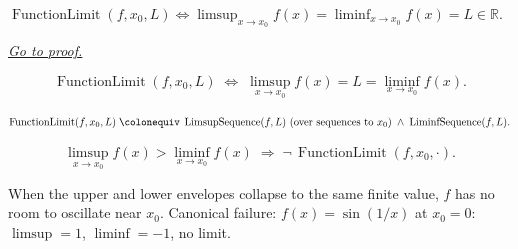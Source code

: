 
\begin{proposition}[Limit Exists iff $\limsup=\liminf$]
\label{prop:limsup-liminf-limit-criterion}
$\operatorname{FunctionLimit}(f,x_0,L)\iff
\limsup_{x\to x_0}f(x)=\liminf_{x\to x_0}f(x)=L\in\mathbb{R}$.

\smallskip\noindent
\hyperref[prf:limsup-liminf-limit-criterion]{\textit{Go to proof.}}
\end{proposition}

\begin{remark*}
\[
  \operatorname{FunctionLimit}(f,x_0,L)
  \;\iff\;
  \limsup_{x\to x_0}f(x)=L=\liminf_{x\to x_0}f(x).
\]
\end{remark*}

\begin{remark*}
\[
  \operatorname{FunctionLimit}(f,x_0,L)
  \;\colonequiv\;
  \operatorname{LimsupSequence}(f,L)\text{ (over sequences to }x_0)
  \;\wedge\;
  \operatorname{LiminfSequence}(f,L).
\]
\end{remark*}

\begin{remark*}
\[
  \limsup_{x\to x_0}f(x)>\liminf_{x\to x_0}f(x)
  \;\Rightarrow\;
  \neg\,\operatorname{FunctionLimit}(f,x_0,\cdot).
\]
\end{remark*}

\begin{remark*}[Interpretation]
When the upper and lower envelopes collapse to the same finite value,
$f$ has no room to oscillate near $x_0$. Canonical failure:
$f(x)=\sin(1/x)$ at $x_0=0$: $\limsup=1$, $\liminf=-1$, no limit.
\end{remark*}
